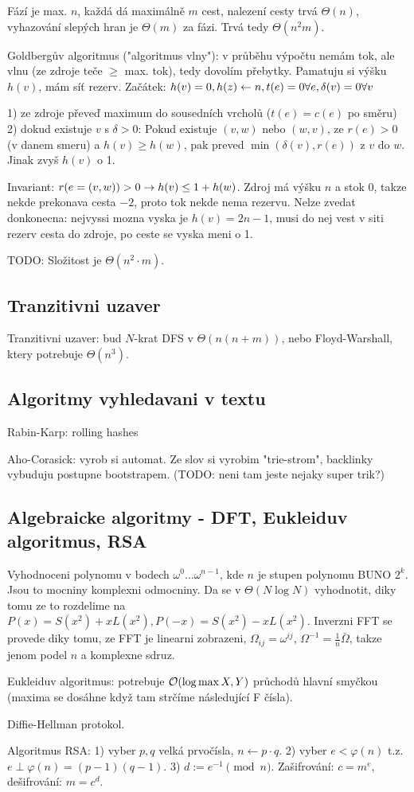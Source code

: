 Fází je max. $n$, každá dá maximálně $m$ cest, nalezení cesty trvá $\Theta(n)$,
vyhazování slepých hran je $\Theta(m)$ za fázi. Trvá tedy $\Theta(n^2 m)$.

Goldbergův algoritmus ("algoritmus vlny"):
v průběhu výpočtu nemám tok, ale vlnu (ze zdroje teče $\geq$ max. tok),
tedy dovolím přebytky. Pamatuju si výšku $h(v)$, mám síť rezerv.
Začátek: $h(v)=0, h(z)\gets n, t(e)=0 \forall e, \delta(v)=0 \forall v$

1) ze zdroje převeď maximum do sousedních vrcholů ($t(e)=c(e)$ po směru)
2) dokud existuje $v$ s $\delta>0$:
	Pokud existuje $(v,w)$ nebo $(w,v)$, ze $r(e)>0$ (v danem smeru)
	a $h(v)\geq h(w)$, pak preved $\min(\delta(v), r(e))$ z $v$ do $w$.
	Jinak zvyš $h(v)$ o 1.

Invariant: $r(e=(v,w))>0\rightarrow h(v)\leq 1+h(w)$.
Zdroj má výšku $n$ a stok $0$, takze nekde prekonava cesta $-2$, proto tok nekde
nema rezervu.
Nelze zvedat donkonecna: nejvyssi mozna vyska je $h(v)=2n-1$, musi do nej vest v
siti rezerv cesta do zdroje, po ceste se vyska meni o 1.

TODO: Složitost je $\Theta(n^2\cdot m)$.

\subsection{Tranzitivni uzaver}
Tranzitivni uzaver: bud $N$-krat DFS v $\Theta(n(n+m))$, nebo Floyd-Warshall,
ktery potrebuje $\Theta(n^3)$.

\subsection{Algoritmy vyhledavani v textu}
Rabin-Karp: rolling hashes

Aho-Corasick: vyrob si automat. Ze slov si vyrobim "trie-strom", backlinky
vybuduju postupne bootstrapem. (TODO: neni tam jeste nejaky super trik?)

\subsection{Algebraicke algoritmy - DFT, Eukleiduv algoritmus, RSA}

\begin{understood}
Vyhodnoceni polynomu v bodech $\omega^0\ldots\omega^{n-1}$, kde
$n$ je stupen polynomu BUNO $2^k$. Jsou to mocniny komplexni odmocniny.
Da se v $\Theta(N\log N)$ vyhodnotit, diky tomu ze to rozdelime na
$P(x)=S(x^2)+xL(x^2), P(-x)=S(x^2)-xL(x^2)$. Inverzni FFT se provede
diky tomu, ze FFT je linearni zobrazeni, $\Omega_{ij}=\omega^{ij}$,
$\Omega^{-1}=\frac{1}{n}\bar{\Omega}$, takze jenom podel $n$ a komplexne sdruz.
\end{understood}

Eukleiduv algoritmus: potrebuje $\mathcal{O}(\log \max{X,Y})$ průchodů hlavní smyčkou
(maxima se dosáhne když tam strčíme následující F čísla).

\begin{understood}
Diffie-Hellman protokol.

Algoritmus RSA: 1) vyber $p,q$ velká prvočísla, $n\gets p\cdot q$.
2) vyber $e<\varphi(n)$ t.z. $e\perp \varphi(n)=(p-1)(q-1)$.
3) $d:=e^{-1}\pmod n$.
Zašifrování: $c=m^e$, dešifrování: $m=c^d$.
\end{understood}
